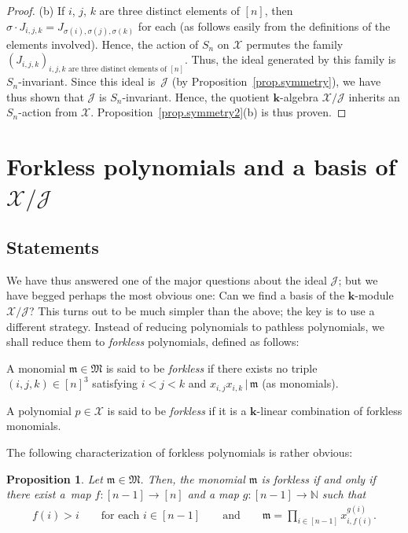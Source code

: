 \documentclass[pdftex]{sigma}
\newtheorem{Proposition}[Theorem]{Proposition}
\numberwithin{equation}{section}
\let\prodnonlimits\prod
\renewcommand{\prod}{\prodnonlimits\limits}
\begin{document}
\begin{proof}
(b) If $i$, $j$, $k$ are three distinct elements of $[n] $, then $\sigma\cdot J_{i,j,k}=J_{\sigma(i) ,\sigma(j) ,\sigma ( k ) }$ for each  (as follows easily from the definitions of the elements involved). Hence, the action of $S_{n}$ on $\mathcal{X}$ permutes the family $ ( J_{i,j,k} )_{i,j,k\text{ are three distinct elements of }[n] }$. Thus, the ideal generated by this family is $S_{n}$-invariant. Since this ideal is~$\mathcal{J}$ (by Proposition~\ref{prop.symmetry}), we have thus shown that $\mathcal{J}$ is $S_{n}$-invariant. Hence, the quotient $\mathbf{k}$-algebra $\mathcal{X}/\mathcal{J}$ inherits an $S_{n}$-action from $\mathcal{X}$. Proposition~\ref{prop.symmetry2}(b) is thus proven.
\end{proof}

\section[Forkless polynomials and a basis of $\mathcal{X}/\mathcal{J}$]{Forkless polynomials and a basis of $\boldsymbol{\mathcal{X}/\mathcal{J}}$}

\subsection{Statements}

 We have thus answered one of the major questions about the ideal $\mathcal{J}$; but we have begged perhaps the most obvious one: Can we find a basis of the $\mathbf{k}$-module $\mathcal{X}/\mathcal{J}$? This turns out to be much simpler than the above; the key is to use a different strategy. Instead of reducing polynomials to pathless polynomials, we shall reduce them to \textit{forkless} polynomials, defined as follows:

\begin{Definition} A monomial $\mathfrak{m}\in\mathfrak{M}$ is said to be \textit{forkless} if there exists no triple $(i,j,k) \in[n] ^{3}$ satisfying $i<j<k$ and $x_{i,j}x_{i,k}\,|\,\mathfrak{m}$ (as monomials).

A polynomial $p\in\mathcal{X}$ is said to be \textit{forkless} if it is a $\mathbf{k}$-linear combination of forkless monomials.
\end{Definition}

The following characterization of forkless polynomials is rather obvious:

\begin{Proposition}Let $\mathfrak{m}\in\mathfrak{M}$. Then, the monomial $\mathfrak{m}$ is forkless if and only if there exist a~map $f\colon [n-1] \rightarrow[n] $ and a map $g\colon [n-1] \rightarrow
\mathbb{N}$ such that
\begin{gather*}
 f(i) >i \qquad \text{for each }i\in[n-1] \qquad \text{and}\qquad \mathfrak{m}=\prod _{i\in[n-1] }x_{i,f(i) }^{g(i) }.
\end{gather*}
\end{Proposition}
\end{document}
